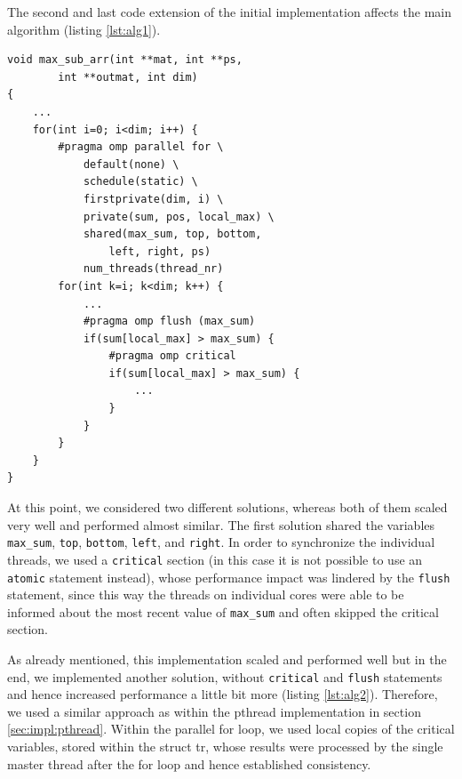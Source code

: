 \documentclass[conference]{IEEEtran}
\begin{document}
The second and last code extension of the initial implementation affects the main algorithm (listing \ref{lst:alg1}). 


\begin{center}
   \begin{lstlisting}[captionpos=b, caption=OpenMP: Parallel Main Algorithm - First Approach, label=lst:alg1]  
void max_sub_arr(int **mat, int **ps, 
        int **outmat, int dim)                                                   
{                                                              
    ... 
    for(int i=0; i<dim; i++) {
        #pragma omp parallel for \
            default(none) \
            schedule(static) \
            firstprivate(dim, i) \
            private(sum, pos, local_max) \
            shared(max_sum, top, bottom, 
                left, right, ps)
            num_threads(thread_nr)
        for(int k=i; k<dim; k++) { 
            ...
            #pragma omp flush (max_sum)       
            if(sum[local_max] > max_sum) {    
                #pragma omp critical          
                if(sum[local_max] > max_sum) {
                    ...
                }
            }              
        }
    }
}
   \end{lstlisting}
\end{center}	

At this point, we considered two different solutions, whereas both of them scaled very well and performed almost similar. The first solution shared the variables \texttt{max\_sum}, \texttt{top}, \texttt{bottom}, \texttt{left}, and \texttt{right}. In order to synchronize the individual threads, we used a \texttt{critical} section (in this case it is not possible to use an \texttt{atomic} statement instead), whose performance impact was lindered by the \texttt{flush} statement, since this way the threads on individual cores were able to be informed about the most recent value of \texttt{max\_sum} and often skipped the critical section. 

As already mentioned, this implementation scaled and performed well but in the end, we implemented another solution, without \texttt{critical} and \texttt{flush} statements and hence increased performance a little bit more (listing \ref{lst:alg2}). Therefore, we used a similar approach as within the pthread implementation in section \ref{sec:impl:pthread}. Within the parallel for loop, we used local copies of the critical variables, stored within the struct tr, whose results were processed by the single master thread after the for loop and hence established consistency. 
\end{document}
